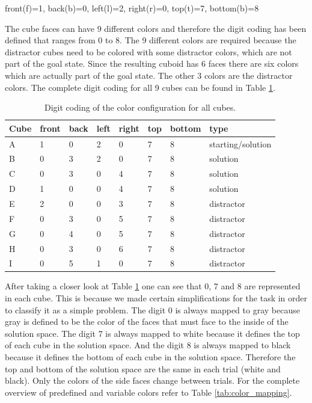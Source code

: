 \documentclass{article}
\begin{document}
front(f)=1, back(b)=0, left(l)=2, right(r)=0, top(t)=7, bottom(b)=8

The cube faces can have 9 different colors and therefore the digit coding has been defined that ranges from 0 to 8. The 9 different colors are required because the distractor cubes need to be colored with some distractor colors, which are not part of the goal state. Since the resulting cuboid has 6 faces there are six colors which are actually part of the goal state. The other 3 colors are the distractor colors. The complete digit coding for all 9 cubes can be found in Table \ref{tab:digit_coding}.

\begin{table}
\begin{center}
    \begin{tabular}{| l | | l | l | l | l | l | l |  l |}
    \hline
    Cube & front & back & left & right & top & bottom & type \\ \hline
    A & 1 & 0 & 2 & 0 & 7 & 8 & starting/solution \\ \hline
    B & 0 & 3 & 2 & 0 & 7 & 8 & solution \\ \hline
    C & 0 & 3 & 0 & 4 & 7 & 8 & solution \\ \hline
    D & 1 & 0 & 0 & 4 & 7 & 8 & solution \\ \hline
    E & 2 & 0 & 0 & 3 & 7 & 8 & distractor \\ \hline
    F & 0 & 3 & 0 & 5 & 7 & 8 & distractor \\ \hline
    G & 0 & 4 & 0 & 5 & 7 & 8 & distractor \\ \hline
    H & 0 & 3 & 0 & 6 & 7 & 8 & distractor \\ \hline
    I & 0 & 5 & 1 & 0 & 7 & 8 & distractor \\ \hline
    \end{tabular}
\end{center}
\caption{Digit coding of the color configuration for all cubes.}
\label{tab:digit_coding}
\end{table}

After taking a closer look at Table \ref{tab:digit_coding} one can see that 0, 7 and 8 are represented in each cube. This is because we made certain simplifications for the task in order to classify it as a simple problem. The digit 0 is always mapped to gray because gray is defined to be the color of the faces that must face to the inside of the solution space. The digit 7 is always mapped to white because it defines the top of each cube in the solution space. And the digit 8 is always mapped to black because it defines the bottom of each cube in the solution space. Therefore the top and bottom of the solution space are the same in each trial (white and black). Only the colors of the side faces change between trials. For the complete overview of predefined and variable colors refer to Table \ref{tab:color_mapping}.
\end{document}
